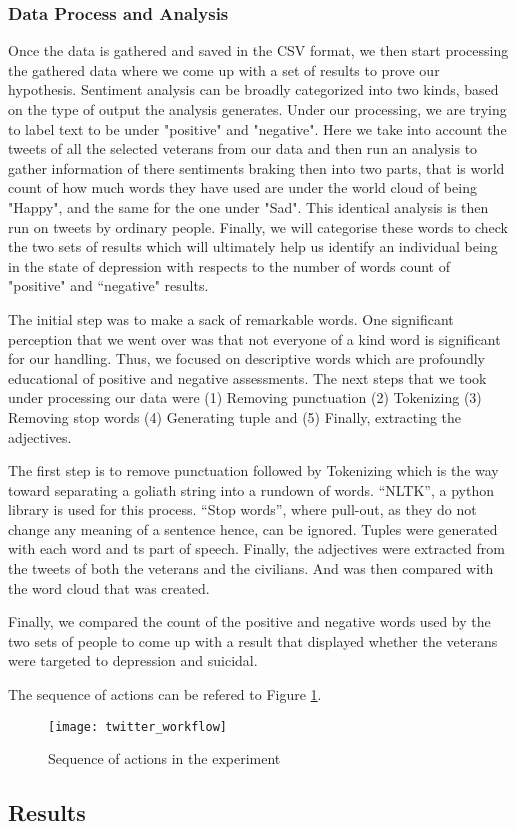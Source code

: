 \subsubsection{Data Process and Analysis}

Once the data is gathered and saved in the CSV format, we then start processing
the gathered data where we come up with a set of results to prove our
hypothesis. Sentiment analysis can be broadly categorized into two kinds, based
on the type of output the analysis generates. Under our processing, we are
trying to label text to be under "positive" and "negative". Here we take into
account the tweets of all the selected veterans from our data and then run an
analysis to gather information of there sentiments braking then into two parts,
that is world count of how much words they have used are under the world cloud
of being "Happy", and the same for the one under "Sad". This identical analysis
is then run on tweets by ordinary people. Finally, we will categorise these
words to check the two sets of results which will ultimately help us identify
an individual being in the state of depression with respects to the number of
words count of "positive" and “negative" results.

The initial step was to make a sack of remarkable words. One significant
perception that we went over was that not everyone of a kind word is significant
for our handling. Thus, we focused on descriptive words which are profoundly
educational of positive and negative assessments. The next steps that we took
under processing our data were (1) Removing punctuation (2) Tokenizing (3)
Removing stop words (4) Generating tuple and (5) Finally, extracting the
adjectives.

The first step is to remove punctuation followed by Tokenizing which is the way
toward separating a goliath string into a rundown of words. “NLTK”, a python
library is used for this process. “Stop words”, where pull-out, as they do not
change any meaning of a sentence hence, can be ignored. Tuples were generated
with each word and ts part of speech. Finally, the adjectives were extracted
from the tweets of both the veterans and the civilians. And was then compared
with the word cloud that was created.

Finally, we compared the count of the positive and negative words used by the
two sets of people to come up with a result that displayed whether the veterans
were targeted to depression and suicidal.

The sequence of actions can be refered to Figure \ref{pic:workflow}.

\begin{figure}[h]
  \centering
  \caption{Sequence of actions in the experiment}
  \label{pic:workflow}
  \texttt{[image: twitter\_workflow]}
\end{figure}

\subsection{Results}
